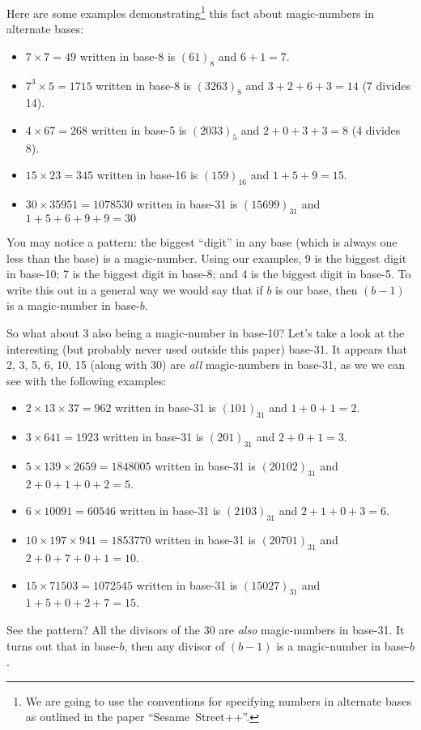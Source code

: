 \documentclass{article}
\begin{document}
Here are some examples demonstrating\footnote{We are going to use the conventions for specifying
numbers in alternate bases as outlined in the paper ``Sesame~Street++''.} this fact about magic-numbers
in alternate bases:
\begin{itemize}
\item $7\times{}7=49$ written in base-8 is $(61)_8$ and $6+1=7$.
\item $7^3\times{}5=1715$ written in base-8 is $(3263)_8$ and $3+2+6+3=14$ (7 divides 14).
\item $4\times{}67=268$ written in base-5 is $(2033)_5$ and $2+0+3+3=8$ (4 divides 8).
\item $15\times{}23=345$ written in base-16 is $(159)_{16}$ and $1+5+9=15$.
\item $30\times{}35951=1078530$ written in base-31 is $(15699)_{31}$ and $1+5+6+9+9=30$
\end{itemize}

You may notice a pattern: the biggest ``digit'' in any base (which is always one less than the base) is a magic-number.
Using our examples, 9 is the biggest
digit in base-10; 7 is the biggest digit in base-8; and 4 is the biggest digit in base-5.  To write this out in a general way
we would say that if $b$ is our base, then $(b-1)$ is a magic-number in base-$b$.

So what about 3 also being a magic-number in base-10?  Let's take a look at the interesting (but probably never used outside this paper) base-31.
It appears that 2, 3, 5, 6, 10, 15 (along with 30) are \emph{all} magic-numbers in base-31, as we we can see
with the following examples:
\begin{itemize}
\item $2\times{}13\times{}37=962$ written in base-31 is $(101)_{31}$ and $1+0+1=2$.
\item $3\times{}641=1923$ written in base-31 is $(201)_{31}$ and $2+0+1=3$.
\item $5\times{}139\times{}2659=1848005$ written in base-31 is $(20102)_{31}$ and $2+0+1+0+2=5$.
\item $6\times{}10091=60546$ written in base-31 is $(2103)_{31}$ and $2+1+0+3=6$.
\item $10\times{}197\times{}941=1853770$ written in base-31 is $(20701)_{31}$ and $2+0+7+0+1=10$.
\item $15\times{}71503=1072545$ written in base-31 is $(15027)_{31}$ and $1+5+0+2+7=15$.
\end{itemize}

See the pattern? All the divisors of the 30 are \emph{also} magic-numbers in base-31.
It turns out that in base-$b$, then any divisor of $(b-1)$ is a magic-number in base-$b$.
\end{document}
